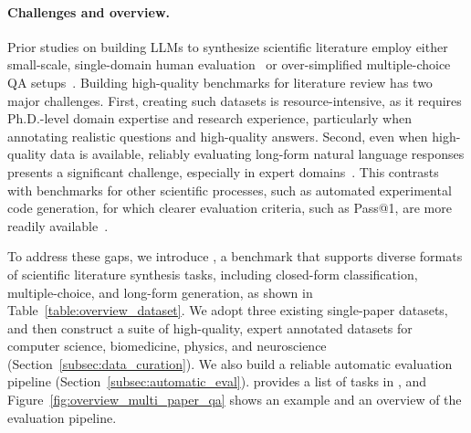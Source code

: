 \label{sec:dataset}
\paragraph{Challenges and overview.}
Prior studies on building LLMs to synthesize scientific literature employ either small-scale, single-domain human evaluation~\citep{agarwal2024litllm,zheng2024openresearcher} or over-simplified multiple-choice QA setups~\citep{skarlinski2024language}. 
Building high-quality benchmarks for literature review has two major challenges. First, creating such datasets is resource-intensive, as it requires Ph.D.-level domain expertise and research experience, particularly when annotating realistic questions and high-quality answers. Second, even when high-quality data is available, reliably evaluating long-form natural language responses presents a significant challenge, especially in expert domains~\citep{xu2023critical,xu-etal-2024-kiwi}. This contrasts with benchmarks for other scientific processes, such as automated experimental code generation, for which clearer evaluation criteria, such as Pass@1, are more readily available~\citep{si2024can}.

To address these gaps, we introduce \data, a  benchmark that supports diverse formats of scientific literature synthesis tasks, including closed-form classification, multiple-choice, and long-form generation, as shown in Table~\ref{table:overview_dataset}.
We adopt three existing single-paper datasets, and then construct a suite of high-quality, expert annotated datasets for computer science, biomedicine,  physics, and neuroscience (Section~\ref{subsec:data_curation}). We also build a reliable automatic evaluation pipeline (Section~\ref{subsec:automatic_eval}). 
 provides a list of tasks in \data, and Figure~\ref{fig:overview_multi_paper_qa} shows an example and an overview of the evaluation pipeline. 


